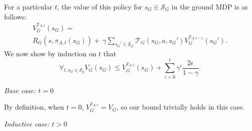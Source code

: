 For a particular $t$, the value of this policy for $s_G \in \mathcal{S}_G$ in the ground \ac{MDP} is as follows:
\begin{multline*}
V_G^{\pi_{A,t}}(s_G) = \\
R_G(s, \pi_{A,t}(s_G)) +\ \gamma \sum_{{s_G}' \in \mathcal{S}_G}\mathcal{T}_G(s_G, a, {s_G}')V_G^{\pi_{A,t-1}}({s_G}').
\end{multline*}
We now show by induction on $t$ that
\begin{equation}
\forall_{t, s_G \in \mathcal{S}_g} V_G(s_G) \leq  V_G^{\pi_{A,t}}(s_G) + \sum_{i=0}^{t}\gamma^i \frac{2\epsilon}{1-\gamma}.
\end{equation}

\textit{Base case: $t=0$}

By definition, when $t=0$, $V_G^{\pi_{A,t}} = V_G$, so our bound trivially holds in this case.

\textit{Inductive case: $t > 0$}

